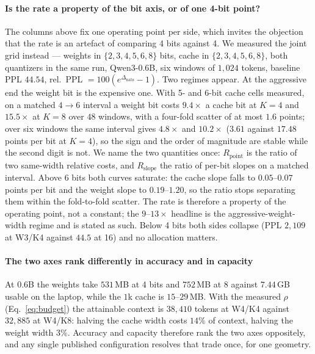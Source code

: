 \documentclass[10pt,journal]{IEEEtran}
\newcommand{\rhoSym}{\rho}
\begin{document}
\paragraph*{Is the rate a property of the bit axis, or of one 4-bit point?}
The columns above fix one operating point per side, which invites the objection
that the rate is an artefact of comparing 4 bits against 4. We measured the
joint grid instead --- weights in $\{2,3,4,5,6,8\}$ bits, cache in $\{2,3,4,5,6,8\}$,
both quantizers in the same run, Qwen3-0.6B, six windows of $1{,}024$ tokens,
baseline PPL $44.54$, rel.\ PPL $=100(e^{\Delta_{\mathrm{nats}}}-1)$. Two
regimes appear. At the aggressive end the weight bit is the expensive one. With 5- and 6-bit
cache cells measured, on a matched $4{\to}6$ interval a weight bit costs
$9.4\times$ a cache bit at $K{=}4$ and $15.5\times$ at $K{=}8$ over $48$ windows,
with a four-fold scatter of at most $1.6$ points; over six windows the same
interval gives $4.8\times$ and $10.2\times$ ($3.61$ against $17.48$ points per
bit at $K{=}4$), so the sign and the order of magnitude are stable while the
second digit is not. We name the two quantities once:
$R_{\mathrm{point}}$ is the ratio of two same-width relative costs, and
$R_{\mathrm{slope}}$ the ratio of per-bit slopes on a matched interval. Above
6 bits both curves saturate: the cache slope falls to $0.05$--$0.07$ points per
bit and the weight slope to $0.19$--$1.20$, so the ratio stops separating them
within the fold-to-fold scatter. The rate is therefore a property of
the operating point, not a constant; the $9$--$13\times$ headline is the
aggressive-weight-width regime and is stated as such. Below 4 bits both sides
collapse (PPL $2{,}109$ at W3/K4 against $44.5$ at 16) and no allocation matters.

\paragraph*{The two axes rank differently in accuracy and in capacity}
At 0.6B the weights take $531$\,MB at 4 bits and $752$\,MB at 8 against
$7.44$\,GB usable on the laptop, while the $1$k cache is $15$--$29$\,MB. With
the measured $\rhoSym$ (Eq.~\ref{eq:budget}) the attainable context is
$38{,}410$ tokens at W4/K4 against $32{,}885$ at W4/K8: halving the cache width
costs $14\%$ of context, halving the weight width $3\%$. Accuracy and capacity
therefore rank the two axes oppositely, and any single published configuration
resolves that trade once, for one geometry.
\end{document}
